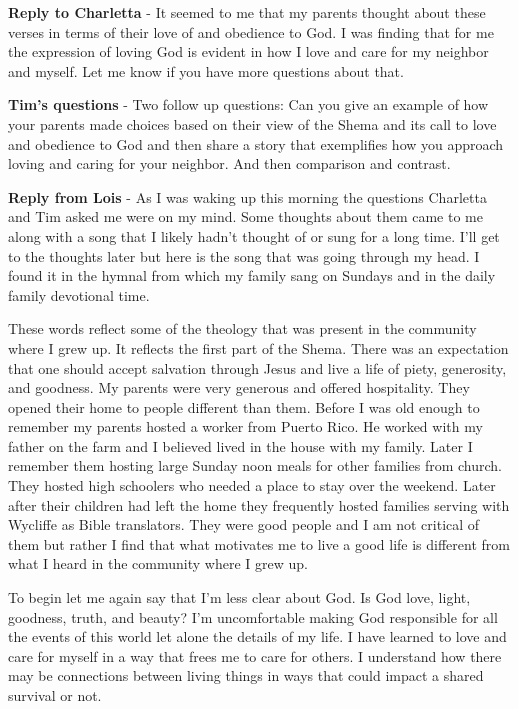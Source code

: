 \textbf{Reply to Charletta} - It seemed to me that my parents thought about these verses in terms of their love of and obedience to God.
I was finding that for me the expression of loving God is evident in how I love and care for my neighbor and myself.
Let me know if you have more questions about that.

\textbf{Tim's questions} - Two follow up questions: Can you give an example of how your parents made choices based on their view of the Shema and its call to love and obedience to God and then share a story that exemplifies how you approach loving and caring for your neighbor.
And then comparison and contrast.


\textbf{Reply from Lois} - As I was waking up this morning the questions Charletta and Tim asked me were on my mind.
Some thoughts about them came to me along with a song that I likely hadn't thought of or sung for a long time.
I'll get to the thoughts later but here is the song that was going through my head.
I found it in the hymnal from which my family sang on Sundays and in the daily family devotional time.

These words reflect some of the theology that was present in the community where I grew up.
It reflects the first part of the Shema.
There was an expectation that one should accept salvation through Jesus and live a life of piety, generosity, and goodness.
My parents were very generous and offered hospitality.
They opened their home to people different than them.
Before I was old enough to remember my parents hosted a worker from Puerto Rico.
He worked with my father on the farm and I believed lived in the house with my family.
Later I remember them hosting large Sunday noon meals for other families from church.
They hosted high schoolers who needed a place to stay over the weekend.
Later after their children had left the home they frequently hosted families serving with Wycliffe as Bible translators.
They were good people and I am not critical of them but rather I find that what motivates me to live a good life is different from what I heard in the community where I grew up.

To begin let me again say that I'm less clear about God.
Is God love, light, goodness, truth, and beauty? I'm uncomfortable making God responsible for all the events of this world let alone the details of my life.
I have learned to love and care for myself in a way that frees me to care for others.
I understand how there may be connections between living things in ways that could impact a shared survival or not.

